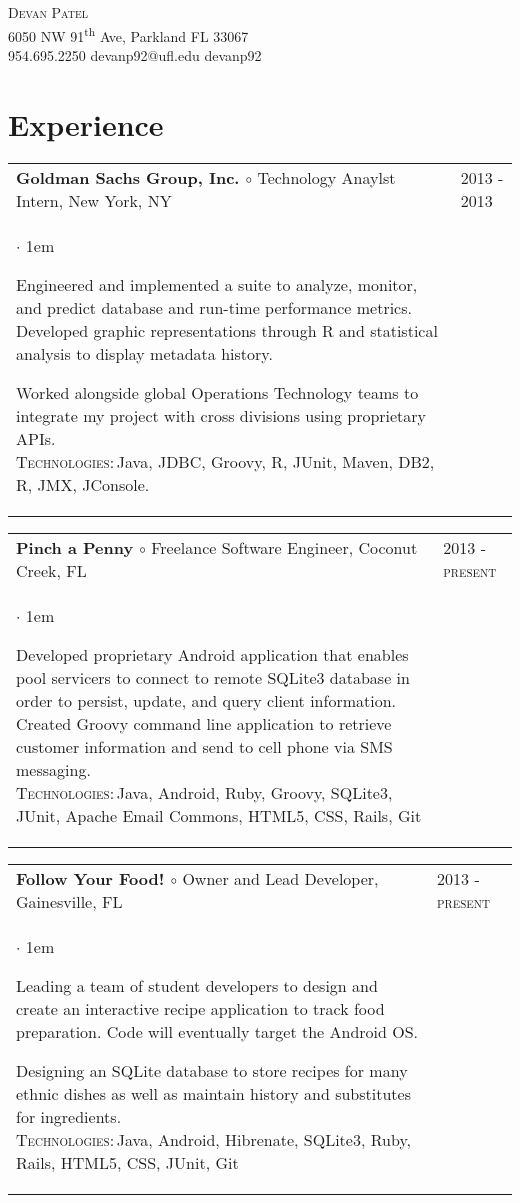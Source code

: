 \documentclass[11pt]{article}
\makeatletter
\newcommand{\employer}[4]
	{{ \begin{tabular}{l@{\hspace{5mm}}|p{30mm}}
	   \multicolumn{1}{l}{\textbf{#1 $\circ$ }#2}&\multicolumn{1}{p{30mm}}{\hspace{-3mm}\textsc{#3}} \\
	   \parbox{.825\textwidth}{#4 \vspace*{-4pt}}
	   \end{tabular} \vspace{4pt} }}
\newcommand{\contact}[5]
	{\begin{center}
		{\LARGE \scshape{#1}}\\
		#2\\
		\Telefon \hspace{0.5ex} #3 \hspace{1em} \Letter \hspace{0.5ex} #4 \hspace{1em} \faGithub \hspace{0.5ex} #5
	\end{center}
	\vspace*{-8pt}}
\newenvironment{achievements}           %
	{\begin{list}{$\cdot$}{\topsep 0pt \itemsep 4pt \parsep 0pt \leftmargin 1em}
	 \linespread{1.05} \selectfont %
	}
	{\end{list}\vspace*{4pt}}
\def\kt{\vspace*{2pt}\\\textsc{Technologies:\,}}
\makeatother
\begin{document}
\contact{Devan Patel}
{6050 NW 91\textsuperscript{th} Ave, Parkland FL 33067}
{954.695.2250}
{devanp92@ufl.edu}
{devanp92}
\section{Experience}
\employer{Goldman Sachs Group, Inc.}{Technology Anaylst Intern, New York, NY}{2013 - 2013}{
	\begin{achievements}
	
	\item{Engineered and implemented a suite to analyze, monitor, and predict database and run-time performance metrics. Developed graphic representations through R and statistical analysis to display metadata history.}
		
	\item{Worked alongside global Operations Technology teams to integrate my project with cross divisions using proprietary APIs.\kt Java, JDBC, Groovy, R, JUnit, Maven, DB2, R, JMX, JConsole.}

	\end{achievements} 
}


\employer{Pinch a Penny}{Freelance Software Engineer, Coconut Creek, FL}{2013 - present}{
	\begin{achievements}
	
	\item{Developed proprietary Android application that enables pool servicers to connect to remote SQLite3 database in order to persist, update, and query client information. Created Groovy command line application to retrieve customer information and send to cell phone via SMS messaging.  \kt Java, Android, Ruby, Groovy, SQLite3, JUnit, Apache Email Commons, HTML5, CSS, Rails, Git}
	
	\end{achievements}
}

\employer{Follow Your Food!}{Owner and Lead Developer, Gainesville, FL}{2013 - present}{
	\begin{achievements}
	
	\item{Leading a team of student developers to design and create an interactive recipe application to track food preparation. Code will eventually target the Android OS.}
	
	\item{Designing an SQLite database to store recipes for many ethnic dishes as well as maintain history and substitutes for ingredients.\kt Java, Android, Hibrenate, SQLite3, Ruby, Rails, HTML5, CSS, JUnit, Git}
	
	\end{achievements}
}
\end{document}
